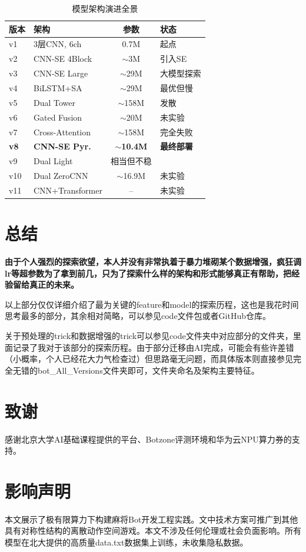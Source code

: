 \documentclass{article}
\begin{document}
\begin{table}[ht]
\caption{模型架构演进全景}
\label{tab:model_evo}
\begin{center}
\footnotesize
\begin{tabular}{llcl}
\toprule
版本 & 架构 & 参数 & 状态 \\
\midrule
v1  & 3层CNN, 6ch & 0.7M & 起点 \\
v2  & CNN-SE 4Block & $\sim$3M & 引入SE \\
v3  & CNN-SE Large & $\sim$29M & 大模型探索 \\
v4  & BiLSTM+SA & $\sim$29M & 最优但慢 \\
v5  & Dual Tower & $\sim$158M & 发散 \\
v6  & Gated Fusion & $\sim$20M & 未实验 \\
v7  & Cross-Attention & $\sim$158M & 完全失败 \\
\textbf{v8} & \textbf{CNN-SE Pyr.} & \textbf{$\sim$10.4M} & \textbf{最终部署} \\
v9  & Dual Light & 相当但不稳 \\
v10 & Dual ZeroCNN & $\sim$16.9M & 未实验 \\
v11 & CNN+Transformer & -- & 未实验 \\
\bottomrule
\end{tabular}
\end{center}
\end{table}

\section{总结}

\textbf{由于个人强烈的探索欲望，本人并没有非常执着于暴力堆砌某个数据增强，疯狂调lr等超参数为了拿到前几，只为了探索什么样的架构和形式能够真正有帮助，把经验留给真正的未来。}

以上部分仅仅详细介绍了最为关键的feature和model的探索历程，这也是我花时间思考最多的部分，其余相对简略，可以参见code文件包或者GitHub仓库。

关于预处理的trick和数据增强的trick可以参见code文件夹中对应部分的文件夹，里面记录了我对于该部分的探索历程。由于部分迁移由AI完成，可能会有些许差错（小概率，个人已经花大力气检查过）但思路毫无问题，而具体版本则直接参见完全无错的bot\_All\_Versions文件夹即可，文件夹命名及架构主要特征。

\section*{致谢}

感谢北京大学AI基础课程提供的平台、Botzone评测环境和华为云NPU算力券的支持。

\section*{影响声明}

本文展示了极有限算力下构建麻将Bot开发工程实践。文中技术方案可推广到其他具有对称性结构的离散动作空间游戏。本文不涉及任何伦理或社会负面影响。所有模型在北大提供的高质量data.txt数据集上训练，未收集隐私数据。

\nocite{*}


\end{document}

